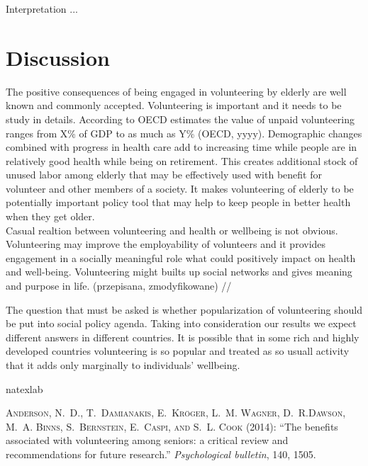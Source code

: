 \documentclass[10pt, letterpaper]{article}
\begin{document}
\begin{spacing}{1.4}
Interpretation ...  
 
\section{Discussion}


The positive consequences of being engaged in volunteering by elderly are well known and commonly accepted. Volunteering is important and it needs to be study in details.  According to OECD estimates the value of unpaid volunteering ranges from X\% of GDP to as much as Y\% (OECD, yyyy).  Demographic changes combined with progress in health care add to increasing time while people are in relatively good health while being on retirement. This creates additional  stock of unused labor among elderly that may be effectively used with benefit for volunteer and other members of a society.  It makes   volunteering of elderly to be potentially important policy tool that may help to keep people in better health when they get older. \\


Casual realtion between volunteering  and health or wellbeing is not obvious. Volunteering may improve the employability of volunteers and it provides engagement in a socially meaningful role  what could positively impact on health and well-being. Volunteering might builts up social networks and gives meaning and purpose in life. (przepisana, zmodyfikowane) //

The question that must be asked is whether popularization of volunteering should be put into social policy agenda. Taking into consideration our results we expect different answers in different countries. It is possible that in some rich and highly developed countries volunteering is so popular and treated as so usuall activity that it adds only marginally to individuals' wellbeing. 

\begin{thebibliography}{87}
\newcommand{\enquote}[1]{``#1''}
\expandafter\ifx\csname natexlab\endcsname\relax\def\natexlab#1{#1}\fi

\textsc{Anderson, N.~D., T.~Damianakis, E.~Kr{\"o}ger, L.~M. Wagner, D.~R.Dawson, M.~A. Binns, S.~Bernstein, E.~Caspi, and S.~L. Cook} (2014):  \enquote{The benefits associated with volunteering among seniors: a critical  review and recommendations for future research.} \emph{Psychological bulletin}, 140, 1505.



\end{thebibliography}
\end{spacing}
\end{document}
